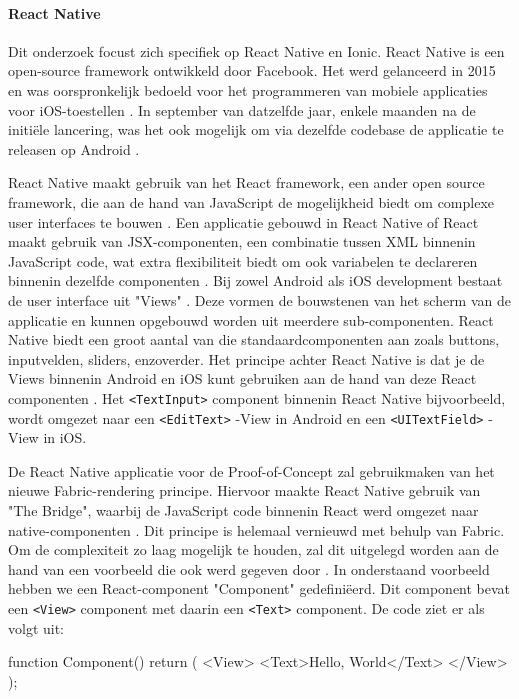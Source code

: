 \paragraph{React Native}

Dit onderzoek focust zich specifiek op React Native en Ionic. React Native is een open-source framework ontwikkeld door Facebook. Het werd gelanceerd in 2015 en was oorspronkelijk bedoeld voor het programmeren van mobiele applicaties voor iOS-toestellen \autocite{Bron2, Bron1}. In september van datzelfde jaar, enkele maanden na de initiële lancering, was het ook mogelijk om via dezelfde codebase de applicatie te releasen op Android \autocite{Bron1}.

React Native maakt gebruik van het React framework, een ander open source framework, die aan de hand van JavaScript de mogelijkheid biedt om complexe user interfaces te bouwen \autocite{Bron17}. Een applicatie gebouwd in React Native of React maakt gebruik van JSX-componenten, een combinatie tussen XML binnenin JavaScript code, wat extra flexibiliteit biedt om ook variabelen te declareren binnenin dezelfde componenten \autocite{Bron2}. Bij zowel Android als iOS development bestaat de user interface uit "Views" \autocite{Bron18}. Deze vormen de bouwstenen van het scherm van de applicatie en kunnen opgebouwd worden uit meerdere sub-componenten. React Native biedt een groot aantal van die standaardcomponenten aan zoals buttons, inputvelden, sliders, enzoverder. Het principe achter React Native is dat je de Views binnenin Android en iOS kunt gebruiken aan de hand van deze React componenten \autocite{Bron18}. Het \verb|<TextInput>| component binnenin React Native bijvoorbeeld, wordt omgezet naar een \verb|<EditText>| -View in Android en een \verb|<UITextField>| -View in iOS.

De React Native applicatie voor de Proof-of-Concept zal gebruikmaken van het nieuwe Fabric-rendering principe. Hiervoor maakte React Native gebruik van "The Bridge", waarbij de JavaScript code binnenin React werd omgezet naar native-componenten \autocite{Bron1}. Dit principe is helemaal vernieuwd met behulp van Fabric. Om de complexiteit zo laag mogelijk te houden, zal dit uitgelegd worden aan de hand van een voorbeeld die ook werd gegeven door \autocite{Bron17}. In onderstaand voorbeeld hebben we een React-component "Component" gedefiniëerd. Dit component bevat een \verb|<View>| component met daarin een \verb|<Text>| component. De code ziet er als volgt uit:

\begin{LVerbatim}
function Component() {
  return (
    <View>
      <Text>Hello, World</Text>
    </View>
  );
}
\end{LVerbatim}

